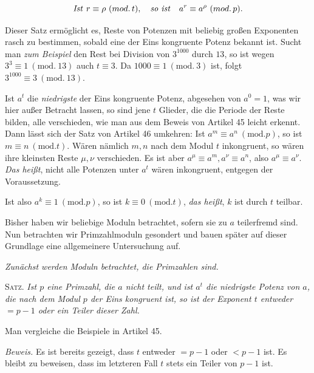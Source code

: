 \[\text{\emph{Ist }}r\equiv\rho\ (mod.\,t),\quad\text{\emph{so ist}}\quad a^r\equiv a^\rho\ (mod.\,p).\]


Dieser Satz ermöglicht es, Reste von Potenzen mit beliebig großen Exponenten rasch zu bestimmen, sobald eine der Eins kongruente Potenz bekannt ist. Sucht man \emph{zum Beispiel} den Rest bei Division von $3^{1000}$ durch $13$, so ist wegen $3^3\equiv1\ (\mathrm{mod.}\ 13)$ auch $t\equiv3$. Da $1000\equiv1\ (\mathrm{mod.}\ 3)$ ist, folgt $3^{1000}\equiv3\ (\mathrm{mod.}\ 13)$.


Ist $a^t$ die \emph{niedrigste} der Eins kongruente Potenz, abgesehen von $a^0=1$, was wir hier außer Betracht lassen, so sind jene $t$ Glieder, die die Periode der Reste bilden, alle verschieden, wie man aus dem Beweis von Artikel 45 leicht erkennt. Dann lässt sich der Satz von Artikel 46 umkehren: Ist $a^m\equiv a^n\ (\mathrm{mod.}p)$, so ist $m\equiv n\ (\mathrm{mod.}t)$. Wären nämlich $m,n$ nach dem Modul $t$ inkongruent, so wären ihre kleinsten Reste $\mu,\nu$ verschieden. Es ist aber $a^\mu\equiv a^m,a^\nu\equiv a^n$, also $a^\mu\equiv a^\nu$. \emph{Das heißt}, nicht alle Potenzen unter $a^t$ wären inkongruent, entgegen der Voraussetzung.

Ist also $a^k\equiv1\ (\mathrm{mod.}p)$, so ist $k\equiv0\ (\mathrm{mod.}t)$, \emph{das heißt}, $k$ ist durch $t$ teilbar.

Bisher haben wir beliebige Moduln betrachtet, sofern sie zu $a$ teilerfremd sind. Nun betrachten wir Primzahlmoduln gesondert und bauen später auf dieser Grundlage eine allgemeinere Untersuchung auf.

\begin{center}\small\emph{Zunächst werden Moduln betrachtet, die Primzahlen sind.}\end{center}


\textsc{Satz.} \emph{Ist $p$ eine Primzahl, die $a$ nicht teilt, und ist $a^t$ die niedrigste Potenz von $a$, die nach dem Modul $p$ der Eins kongruent ist, so ist der Exponent $t$ entweder $=p-1$ oder ein Teiler dieser Zahl.}

Man vergleiche die Beispiele in Artikel 45.

\emph{Beweis.} Es ist bereits gezeigt, dass $t$ entweder $=p-1$ oder $<p-1$ ist. Es bleibt zu beweisen, dass im letzteren Fall $t$ stets ein Teiler von $p-1$ ist.

